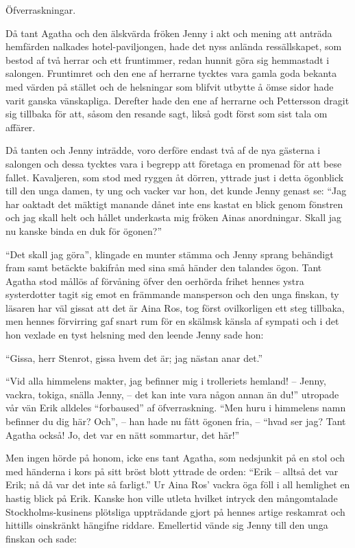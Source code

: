 Öfverraskningar.

Då tant Agatha och den älskvärda fröken Jenny i akt och mening att
anträda hemfärden nalkades hotel-paviljongen, hade det nyss anlända
ressällskapet, som bestod af två herrar och ett fruntimmer, redan hunnit
göra sig hemmastadt i salongen. Fruntimret och den ene af herrarne
tycktes vara gamla goda bekanta med värden på stället och de helsningar
som blifvit utbytte å ömse sidor hade varit ganska vänskapliga. Derefter
hade den ene af herrarne och Pettersson dragit sig tillbaka för att,
såsom den resande sagt, likså godt först som sist tala om affärer.

Då tanten och Jenny inträdde, voro derföre endast två af de nya gästerna
i salongen och dessa tycktes vara i begrepp att företaga en promenad för
att bese fallet. Kavaljeren, som stod med ryggen åt dörren, yttrade just
i detta ögonblick till den unga damen, ty ung och vacker var hon, det
kunde Jenny genast se: ``Jag har oaktadt det mäktigt manande dånet inte
ens kastat en blick genom fönstren och jag skall helt och hållet
underkasta mig fröken Ainas anordningar. Skall jag nu kanske binda en
duk för ögonen?''

``Det skall jag göra'', klingade en munter stämma och Jenny sprang
behändigt fram samt betäckte bakifrån med sina små händer den talandes
ögon. Tant Agatha stod mållös af förvåning öfver den oerhörda frihet
hennes ystra systerdotter tagit sig emot en främmande mansperson och den
unga finskan, ty läsaren har väl gissat att det är Aina Ros, tog först
ovilkorligen ett steg tillbaka, men hennes förvirring gaf snart rum för
en skälmsk känsla af sympati och i det hon vexlade en tyst helsning med
den leende Jenny sade hon:

``Gissa, herr Stenrot, gissa hvem det är; jag nästan anar det.''

``Vid alla himmelens makter, jag befinner mig i trolleriets hemland! --
Jenny, vackra, tokiga, snälla Jenny, -- det kan inte vara någon annan än
du!'' utropade vår vän Erik alldeles ``forbaused'' af öfverraskning.
``Men huru i himmelens namn befinner du dig här? Och'', -- han hade nu
fått ögonen fria, -- ``hvad ser jag? Tant Agatha också! Jo, det var en
nätt sommartur, det här!''

Men ingen hörde på honom, icke ens tant Agatha, som nedsjunkit på en
stol och med händerna i kors på sitt bröst blott yttrade de orden:
``Erik -- alltså det var Erik; nå då var det inte så farligt.'' Ur Aina
Ros' vackra öga föll i all hemlighet en hastig blick på Erik. Kanske hon
ville utleta hvilket intryck den mångomtalade Stockholms-kusinens
plötsliga uppträdande gjort på hennes artige reskamrat och hittills
oinskränkt hängifne riddare. Emellertid vände sig Jenny till den unga
finskan och sade:

